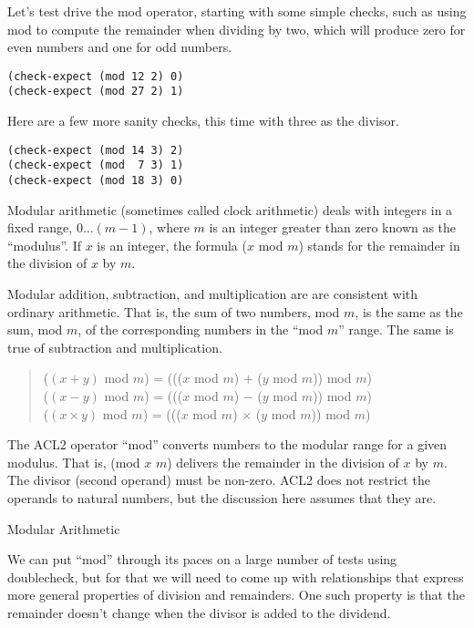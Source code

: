 Let's test drive the mod operator, starting with
some simple checks, such as using mod
to compute the remainder when dividing by two,
which will produce zero for even numbers and one for odd numbers.

\begin{Verbatim}
(check-expect (mod 12 2) 0)
(check-expect (mod 27 2) 1)
\end{Verbatim}

Here are a few more sanity checks, this time with three as the divisor.

\begin{Verbatim}
(check-expect (mod 14 3) 2)
(check-expect (mod  7 3) 1)
(check-expect (mod 18 3) 0)
\end{Verbatim}

\begin{aside}
Modular arithmetic
(sometimes called clock arithmetic)
deals with integers in a fixed range, $0 \dots (m - 1)$,
where $m$ is an integer greater than zero known as
the ``modulus''.
If $x$ is an integer, the formula ($x$ mod $m$) stands for
the remainder in the division of $x$ by $m$.

Modular addition, subtraction, and multiplication are
are consistent with ordinary arithmetic.
That is, the sum of two numbers, mod $m$,
is the same as the sum, mod $m$, of the corresponding numbers
in the ``mod $m$'' range.
The same is true of subtraction and multiplication.

\begin{quote}
($(x + y)$ mod $m$) = ((($x$ mod $m$) $+$ ($y$ mod $m$)) mod $m$) \\
($(x - y)$ mod $m$) = ((($x$ mod $m$) $-$ ($y$ mod $m$)) mod $m$) \\
($(x \times y)$ mod $m$) = ((($x$ mod $m$) $\times$ ($y$ mod $m$)) mod $m$)
\end{quote}

The ACL2 operator ``mod'' converts numbers to the modular range
for a given modulus. That is, (mod $x$ $m$) delivers the remainder
in the division of $x$ by $m$.
The divisor (second operand) must be non-zero.
ACL2 does not restrict the operands to natural numbers,
but the discussion here assumes that they are.
\caption{Modular Arithmetic}
\label{modular-arithmetic}
\end{aside}

We can put ``mod''
through its paces on a large number of tests using doublecheck,
but for that we will need to come up with relationships
that express more general properties of division and remainders.
One such property is that the remainder doesn't change
when the divisor is added to the dividend.

